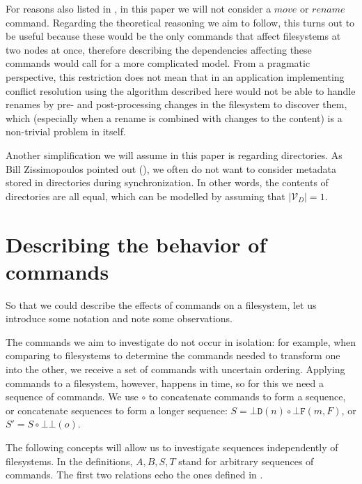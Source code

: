 \documentclass[12pt]{article}
\newcommand{\setvx}[1]{\mathcal{V}_{#1}}
\newcommand{\setd}{\setvx{D}} %
\newcommand{\empt}{\bot}
\newcommand{\fscommand}[2]{{#1#2}}
\newcommand{\fsregcommandchar}[1]{\mathtt{#1}}
\newcommand{\fsregcommand}[2]{\fscommand{\fsregcommandchar{#1}}{\fsregcommandchar{#2}}}
\newcommand{\cbb}{\fsregcommand{\empt}{\empt}}
\newcommand{\cbf}{\fsregcommand{\empt}{F}}
\newcommand{\cbd}{\fsregcommand{\empt}{D}}
\newcommand{\cc}{\circ} %
\theoremstyle{definition}
\begin{document}

For reasons also listed in \cite{NREC:alg}, in this paper we will not consider
a $move$ or $rename$ command. Regarding the theoretical reasoning we aim to follow,
this turns out to be useful because these would be the only commands that affect
filesystems at two nodes at once, therefore describing 
the dependencies affecting these commands
would call for a more complicated model.
From a pragmatic perspective, this restriction does not mean that in an application
implementing conflict resolution using the algorithm described here would not be
able to handle renames by pre- and post-processing changes in the filesystem to
discover them, which (especially when a rename is combined with changes to the content)
is a non-trivial problem in itself.

Another simplification we will assume in this paper is regarding directories.
As Bill Zissimopoulos pointed out (\cite{BZ}), we often do not want to consider metadata stored in
directories during synchronization. In other words, the contents of directories are all equal,
which can be modelled by assuming that $|\setd|=1$.




\section{Describing the behavior of commands}


So that we could describe the effects of commands on a filesystem, let us introduce some notation
and note some observations.

The commands we aim to investigate do not occur in isolation:
for example, when comparing to filesystems to determine the commands needed to transform one into the other,
we receive a set of commands with uncertain ordering.
Applying commands to a filesystem, however, happens in time,
so for this we need a sequence of commands.
We use $\cc$ to concatenate commands to form a sequence, or concatenate sequences to form a longer sequence:
$S=\cbd(n)\cc \cbf(m,F)$, or $S'=S\cc\cbb(o)$.

The following concepts will allow us to investigate sequences independently of filesystems.
In the definitions, $A,B,S,T$ stand for arbitrary sequences of commands.
The first two relations echo the ones defined in \cite{NREC:alg}.
\end{document}
